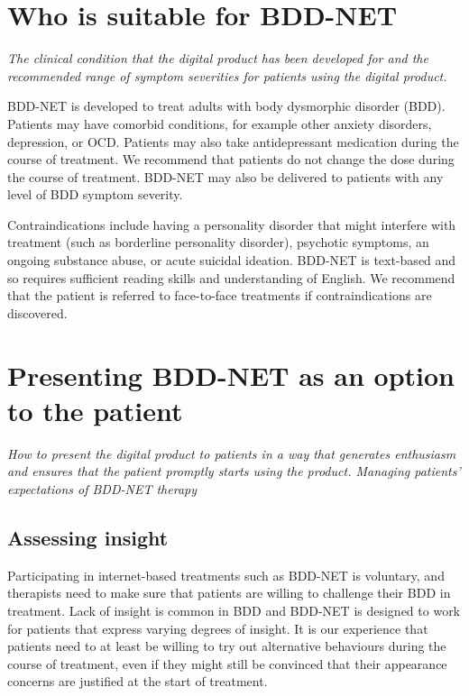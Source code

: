 \documentclass[]{book}
\theoremstyle{definition}
\theoremstyle{definition}
\theoremstyle{definition}
\theoremstyle{remark}
\begin{document}
\hypertarget{who-is-suitable-for-bdd-net}{%
\section{Who is suitable for
BDD-NET}\label{who-is-suitable-for-bdd-net}}

\emph{The clinical condition that the digital product has been developed
for and the recommended range of symptom severities for patients using
the digital product.}

BDD-NET is developed to treat adults with body dysmorphic disorder
(BDD). Patients may have comorbid conditions, for example other anxiety
disorders, depression, or OCD. Patients may also take antidepressant
medication during the course of treatment. We recommend that patients do
not change the dose during the course of treatment. BDD-NET may also be
delivered to patients with any level of BDD symptom severity.

Contraindications include having a personality disorder that might
interfere with treatment (such as borderline personality disorder),
psychotic symptoms, an ongoing substance abuse, or acute suicidal
ideation. BDD-NET is text-based and so requires sufficient reading
skills and understanding of English. We recommend that the patient is
referred to face-to-face treatments if contraindications are discovered.

\hypertarget{presenting-bdd-net-as-an-option-to-the-patient}{%
\section{Presenting BDD-NET as an option to the
patient}\label{presenting-bdd-net-as-an-option-to-the-patient}}

\emph{How to present the digital product to patients in a way that
generates enthusiasm and ensures that the patient promptly starts using
the product. Managing patients' expectations of BDD-NET therapy}

\hypertarget{assessing-insight}{%
\subsection{Assessing insight}\label{assessing-insight}}

Participating in internet-based treatments such as BDD-NET is voluntary,
and therapists need to make sure that patients are willing to challenge
their BDD in treatment. Lack of insight is common in BDD and BDD-NET is
designed to work for patients that express varying degrees of insight.
It is our experience that patients need to at least be willing to try
out alternative behaviours during the course of treatment, even if they
might still be convinced that their appearance concerns are justified at
the start of treatment.
\end{document}
